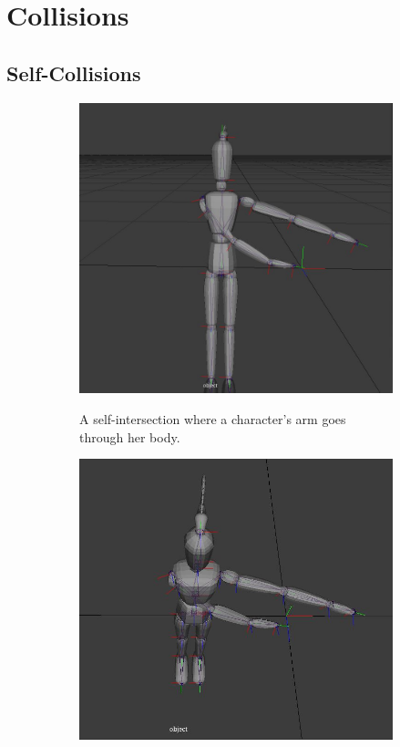 \section{Collisions}
\subsection{Self-Collisions}
\begin{figure}[h!]
	\centering
        \begin{subfigure}[b!]{0.45\textwidth}
        	\centering
                \includegraphics[width=\linewidth]{img/selfintersection}
                \label{fig:self}
                \caption{A self-intersection where a character's arm goes through her body.}
        \end{subfigure}
        \quad
        \begin{subfigure}[b!]{0.45\textwidth}
        	\centering
                \includegraphics[width=\linewidth]{img/selfintersection1}

\end{subfigure}
\end{figure}
